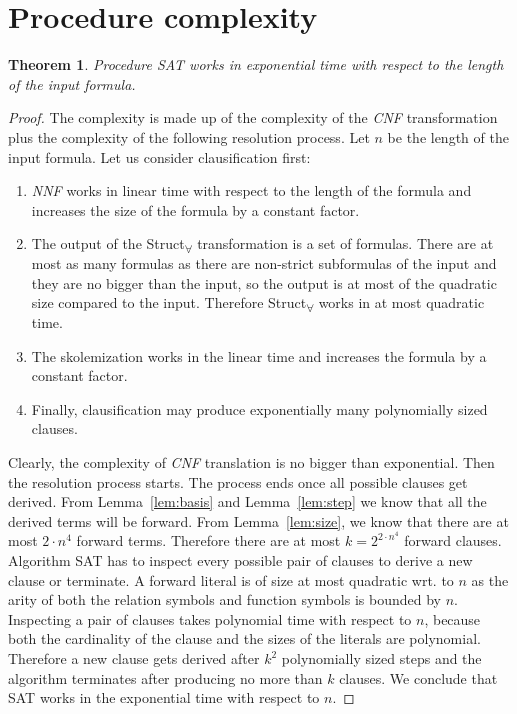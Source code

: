 \documentclass[english, shortabstract]{iithesis}
\theoremstyle{definition} \newtheorem{definition}{Definition}[chapter]
\theoremstyle{remark} \newtheorem{remark}[definition]{Observation}
\theoremstyle{plain} \newtheorem{theorem}[definition]{Theorem}
\theoremstyle{plain} \newtheorem{lemma}[definition]{Lemma}
\begin{document}
\section{Procedure complexity}

\begin{theorem}
Procedure SAT works in exponential time with respect to the length of the input formula. 
\end{theorem}

\begin{proof}
The complexity is made up of the complexity of the \emph{CNF} transformation plus the complexity of the following resolution process.
Let $n$ be the length of the input formula.
Let us consider clausification first:
\begin{enumerate}
    \item \emph{NNF} works in linear time with respect to the length of the formula and increases the size of the formula by a constant factor.
    \item The output of the Struct\textsubscript{{$\forall$}} transformation is a set of formulas. There are at most as many formulas as there are 
    non-strict subformulas of the input and they are no bigger than the input, so the output is at most of the quadratic size compared to the input.
    Therefore Struct\textsubscript{{$\forall$}} works in at most quadratic time.
    \item The skolemization works in the linear time and increases the formula by a constant factor.
    \item Finally, clausification may produce exponentially many polynomially sized clauses.
\end{enumerate}
Clearly, the complexity of \emph{CNF} translation is no bigger than exponential.
Then the resolution process starts. The process ends once all possible clauses get derived.
From Lemma~\ref{lem:basis} and Lemma~\ref{lem:step} we know that all the derived terms will be forward.
From Lemma~\ref{lem:size}, we know that there are at most $2\cdot n^4$ forward terms. 
Therefore there are at most $k=2^{2\cdot n^4}$ forward clauses. 
Algorithm SAT has to inspect every possible pair of clauses to derive a new clause or terminate.
A forward literal is of size at most quadratic wrt. to $n$ as the arity of both the relation symbols and function symbols is bounded by $n$.
Inspecting a pair of clauses takes polynomial time with respect to $n$, because 
both the cardinality of the clause and the sizes of the literals are polynomial.
Therefore a new clause gets derived after $k^2$ polynomially sized steps and the algorithm terminates 
after producing no more than $k$ clauses. 
We conclude that SAT works in the exponential time with respect to $n$.
\end{proof}
\end{document}
